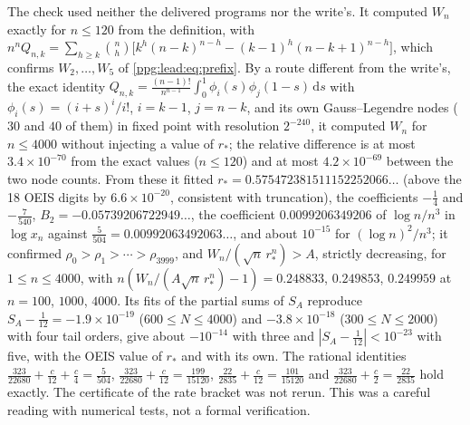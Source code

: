\documentclass[11pt,letterpaper]{article}
\theoremstyle{remark}\newtheorem{remark}[theorem]{Remark}
\numberwithin{equation}{section}
\newcommand{\dd}{\mathrm d}
\begin{document}
The check used neither the delivered programs nor the write's. It computed $W_n$ exactly for $n\le120$ from the definition, with $n^nQ_{n,k}=\sum_{h\ge k}\binom nh\bigl[k^h(n-k)^{n-h}-(k-1)^h(n-k+1)^{n-h}\bigr]$, which confirms $W_2,\ldots,W_5$ of \eqref{ppg:lead:eq:prefix}. By a route different from the write's, the exact identity $Q_{n,k}=\frac{(n-1)!}{n^{n-1}}\int_0^1\phi_i(s)\phi_j(1-s)\,\dd s$ with $\phi_i(s)=(i+s)^i/i!$, $i=k-1$, $j=n-k$, and its own Gauss--Legendre nodes ($30$ and $40$ of them) in fixed point with resolution $2^{-240}$, it computed $W_n$ for $n\le4000$ without injecting a value of $r_*$; the relative difference is at most $3.4\times10^{-70}$ from the exact values ($n\le120$) and at most $4.2\times10^{-69}$ between the two node counts. From these it fitted $r_*=0.575472381511152252066\ldots$ (above the 18 OEIS digits by $6.6\times10^{-20}$, consistent with truncation), the coefficients $-\frac14$ and $-\frac7{540}$, $B_2=-0.05739206722949\ldots$, the coefficient $0.0099206349206$ of $\log n/n^3$ in $\log x_n$ against $\frac5{504}=0.00992063492063\ldots$, and about $10^{-15}$ for $(\log n)^2/n^3$; it confirmed $\rho_0>\rho_1>\cdots>\rho_{3999}$, and $W_n/(\sqrt n\,r_*^n)>A$, strictly decreasing, for $1\le n\le4000$, with $n(W_n/(A\sqrt n\,r_*^n)-1)=0.248833$, $0.249853$, $0.249959$ at $n=100$, $1000$, $4000$. Its fits of the partial sums of $S_A$ reproduce $S_A-\frac1{12}=-1.9\times10^{-19}$ ($600\le N\le4000$) and $-3.8\times10^{-18}$ ($300\le N\le2000$) with four tail orders, give about $-10^{-14}$ with three and $|S_A-\frac1{12}|<10^{-23}$ with five, with the OEIS value of $r_*$ and with its own. The rational identities $\frac{323}{22680}+\frac c{12}+\frac c4=\frac5{504}$, $\frac{323}{22680}+\frac c{12}=\frac{199}{15120}$, $\frac{22}{2835}+\frac c{12}=\frac{101}{15120}$ and $\frac{323}{22680}+\frac c2=\frac{22}{2835}$ hold exactly. The certificate of the rate bracket was not rerun. This was a careful reading with numerical tests, not a formal verification.
\end{document}
